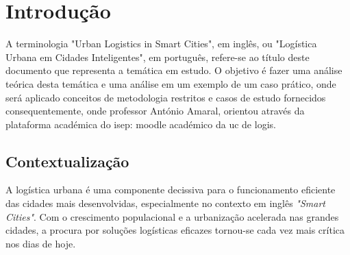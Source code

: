 
\chapter{Introdução} 	%
\label{Chapter1} 		%




A terminologia "Urban Logistics in Smart Cities", em inglês, ou "Logística Urbana em Cidades Inteligentes", em português, refere-se ao título deste documento  que representa a temática em estudo.
O objetivo é fazer uma análise teórica desta temática e uma análise em um exemplo de um caso prático, onde será aplicado conceitos de metodologia restritos e casos de estudo fornecidos consequentemente,  onde professor António Amaral, orientou através da plataforma académica do \gls{isep}: \gls{moodle} académico da \gls{uc} de \gls{logis}\cite{MoodleEnunciado}.

\section{Contextualização}
\label{sec:contextualizacao	}

A logística urbana é uma componente decissiva para o funcionamento eficiente das cidades mais desenvolvidas, especialmente no contexto em inglês \textit{"Smart Cities"}.
Com o crescimento populacional e a urbanização acelerada nas grandes cidades, a procura por soluções logísticas eficazes tornou-se cada vez mais crítica nos dias de hoje.

